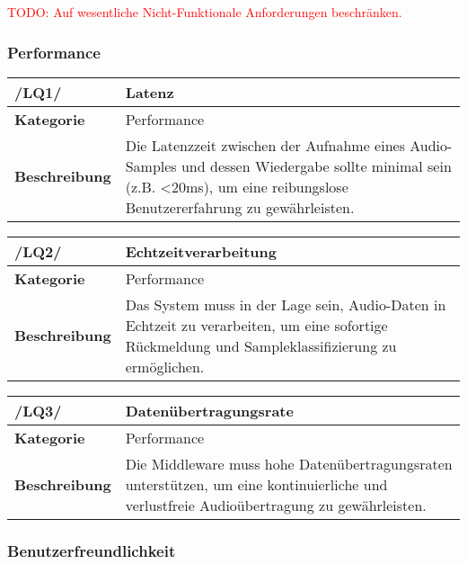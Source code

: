 \textcolor{red}{TODO: Auf wesentliche Nicht-Funktionale Anforderungen beschränken.}

\subsubsection{Performance}

\begin{table}[h!]
\begin{tabularx}{13cm}{|l|X|}
\hline
\textbf{/LQ1/} & \textbf{Latenz} \\ \hline
\textbf{Kategorie} & Performance \\ \hline
\textbf{Beschreibung} & Die Latenzzeit zwischen der Aufnahme eines Audio-Samples und dessen Wiedergabe sollte minimal sein (z.B. <20ms), um eine reibungslose Benutzererfahrung zu gewährleisten. \\ \hline
\end{tabularx}
\end{table}

\begin{table}[h!]
\begin{tabularx}{13cm}{|l|X|}
\hline
\textbf{/LQ2/} & \textbf{Echtzeitverarbeitung} \\ \hline
\textbf{Kategorie} & Performance \\ \hline
\textbf{Beschreibung} & Das System muss in der Lage sein, Audio-Daten in Echtzeit zu verarbeiten, um eine sofortige Rückmeldung und Sampleklassifizierung zu ermöglichen. \\ \hline
\end{tabularx}
\end{table}

\begin{table}[h!]
\begin{tabularx}{13cm}{|l|X|}
\hline
\textbf{/LQ3/} & \textbf{Datenübertragungsrate} \\ \hline
\textbf{Kategorie} & Performance \\ \hline
\textbf{Beschreibung} & Die Middleware muss hohe Datenübertragungsraten unterstützen, um eine kontinuierliche und verlustfreie Audioübertragung zu gewährleisten. \\ \hline
\end{tabularx}
\end{table}

\subsubsection{Benutzerfreundlichkeit}

